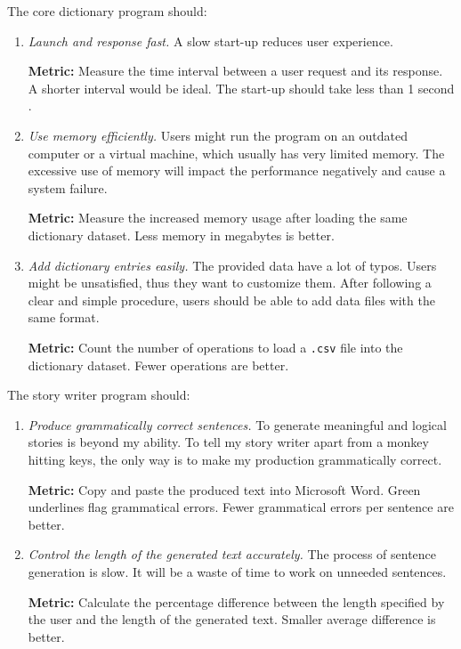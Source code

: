 \documentclass[../main.tex]{subfiles}
\begin{document}
The core dictionary program should:

\begin{enumerate}
	\item \textit{Launch and response fast.}
	A slow start-up reduces user experience.
	
	\textbf{Metric:} Measure the time interval between a user request and its response. A shorter interval would be ideal. The start-up should take less than 1 second \cite{bib:1s_time_limit}.
	
	\item \textit{Use memory efficiently.}
	Users might run the program on an outdated computer or a virtual machine, which usually has very limited memory. The excessive use of memory will impact the performance negatively and cause a system failure.
	
	\textbf{Metric:} Measure the increased memory usage after loading the same dictionary dataset. Less memory in megabytes is better.
	
	\item \textit{Add dictionary entries easily.}
	The provided data have a lot of typos. Users might be unsatisfied, thus they want to customize them. After following a clear and simple procedure, users should be able to add data files with the same format.
	
	\textbf{Metric:} Count the number of operations to load a \texttt{.csv} file into the dictionary dataset. Fewer operations are better.
\end{enumerate}

The story writer program should:

\begin{enumerate}
	\item \textit{Produce grammatically correct sentences.}
	To generate meaningful and logical stories is beyond my ability. To tell my story writer apart from a monkey hitting keys, the only way is to make my production grammatically correct.
	
	\textbf{Metric:} Copy and paste the produced text into Microsoft Word. Green underlines flag grammatical errors. Fewer grammatical errors per sentence are better.
	
	\item \textit{Control the length of the generated text accurately.}
	The process of sentence generation is slow. It will be a waste of time to work on unneeded sentences.
	
	\textbf{Metric:} Calculate the percentage difference between the length specified by the user and the length of the generated text. Smaller average difference is better.
\end{enumerate}
\end{document}
